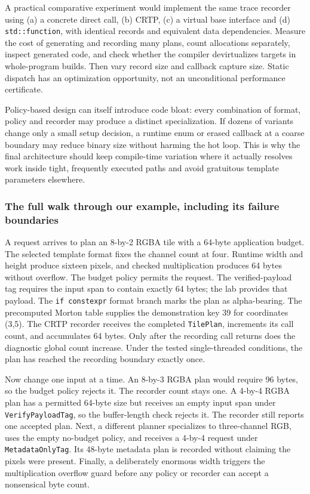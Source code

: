 A practical comparative experiment would implement the same trace recorder using (a) a concrete direct call, (b) CRTP, (c) a virtual base interface and (d) \texttt{std::function}, with identical records and equivalent data dependencies. Measure the cost of generating and recording many plans, count allocations separately, inspect generated code, and check whether the compiler devirtualizes targets in whole-program builds. Then vary record size and callback capture size. Static dispatch has an optimization opportunity, not an unconditional performance certificate.

Policy-based design can itself introduce code bloat: every combination of format, policy and recorder may produce a distinct specialization. If dozens of variants change only a small setup decision, a runtime enum or erased callback at a coarse boundary may reduce binary size without harming the hot loop. This is why the final architecture should keep compile-time variation where it actually resolves work inside tight, frequently executed paths and avoid gratuitous template parameters elsewhere.

\subsubsection{The full walk through our example, including its failure boundaries}\label{the-full-walk-through-our-example-including-its-failure-boundaries}

A request arrives to plan an 8-by-2 RGBA tile with a 64-byte application budget. The selected template format fixes the channel count at four. Runtime width and height produce sixteen pixels, and checked multiplication produces 64 bytes without overflow. The budget policy permits the request. The verified-payload tag requires the input span to contain exactly 64 bytes; the lab provides that payload. The \texttt{if\ constexpr} format branch marks the plan as alpha-bearing. The precomputed Morton table supplies the demonstration key 39 for coordinates (3,5). The CRTP recorder receives the completed \texttt{TilePlan}, increments its call count, and accumulates 64 bytes. Only after the recording call returns does the diagnostic global count increase. Under the tested single-threaded conditions, the plan has reached the recording boundary exactly once.

Now change one input at a time. An 8-by-3 RGBA plan would require 96 bytes, so the budget policy rejects it. The recorder count stays one. A 4-by-4 RGBA plan has a permitted 64-byte size but receives an empty input span under \texttt{VerifyPayloadTag}, so the buffer-length check rejects it. The recorder still reports one accepted plan. Next, a different planner specializes to three-channel RGB, uses the empty no-budget policy, and receives a 4-by-4 request under \texttt{MetadataOnlyTag}. Its 48-byte metadata plan is recorded without claiming the pixels were present. Finally, a deliberately enormous width triggers the multiplication overflow guard before any policy or recorder can accept a nonsensical byte count.

